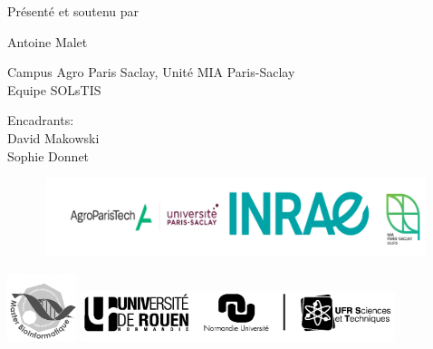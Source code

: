 \documentclass{book}
\begin{document}
\begin{center}
    \large{Présenté et soutenu par}
\end{center}

\begin{center}
    \huge{Antoine Malet}
\end{center}

\begin{center}
    \vspace{1.5cm}
    \Large{Campus Agro Paris Saclay, Unité MIA Paris-Saclay} \\
    \Large{Equipe SOLsTIS}
\end{center}

\begin{center}
    \vspace{0.5cm}
    \large{Encadrants:} \\
    \vspace{0.5cm}
    \large{David Makowski} \\
    \large{Sophie Donnet}
\end{center}

\vspace{1.2cm}
\begin{center}
    \includegraphics[height=2.3cm, width=15cm]{logos.png}
\end{center}

\newpage
\thispagestyle{empty}
\mbox{} %


\newpage
\thispagestyle{empty}
\vspace{-5cm}
\includegraphics[height=2cm]{univBW.png}
\hfill
\includegraphics[height=1.5cm]{URN_NU_ST_BW.png}
\end{document}
